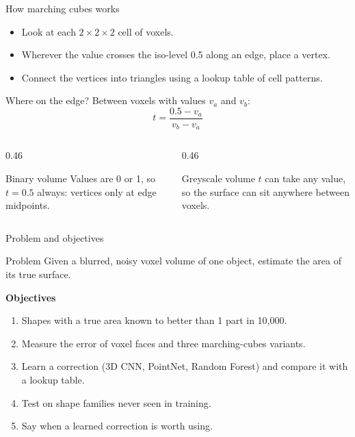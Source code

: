 \documentclass[aspectratio=169,11pt]{beamer}
\begin{document}
\begin{frame}{How marching cubes works}
  \begin{itemize}
    \item Look at each $2\times2\times2$ cell of voxels.
    \item Wherever the value crosses the iso-level 0.5 along an edge, place a vertex.
    \item Connect the vertices into triangles using a lookup table of cell patterns.
  \end{itemize}
  \vspace{0.5em}
  Where on the edge? Between voxels with values $v_a$ and $v_b$:
  \[ t = \frac{0.5 - v_a}{v_b - v_a} \]
  \begin{columns}[T]
    \begin{column}{0.46\textwidth}
      \begin{block}{Binary volume}
        Values are 0 or 1, so $t = 0.5$ always: vertices only at edge midpoints.
      \end{block}
    \end{column}
    \begin{column}{0.46\textwidth}
      \begin{block}{Greyscale volume}
        $t$ can take any value, so the surface can sit anywhere between voxels.
      \end{block}
    \end{column}
  \end{columns}
\end{frame}

\begin{frame}{Problem and objectives}
  \begin{block}{Problem}
    Given a blurred, noisy voxel volume of one object, estimate the area of its true surface.
  \end{block}
  \textbf{Objectives}
  \begin{enumerate}
    \item Shapes with a true area known to better than 1 part in 10{,}000.
    \item Measure the error of voxel faces and three marching-cubes variants.
    \item Learn a correction (3D CNN, PointNet, Random Forest) and compare it with a lookup table.
    \item Test on shape families never seen in training.
    \item Say when a learned correction is worth using.
  \end{enumerate}
\end{frame}
\end{document}
